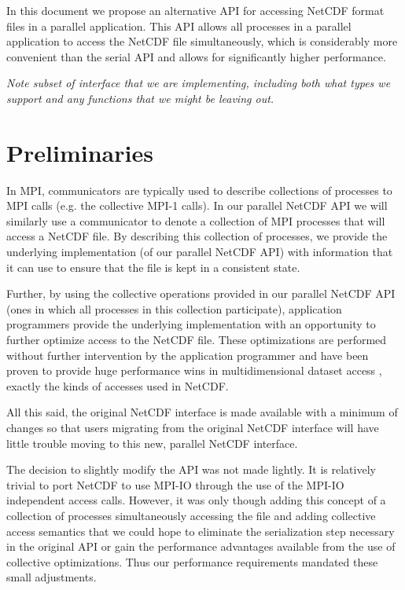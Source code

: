 \documentclass[10pt]{article}
\begin{document}
In this document we propose an alternative API for accessing NetCDF format
files in a parallel application.  This API allows all processes in a parallel
application to access the NetCDF file simultaneously, which is considerably
more convenient than the serial API and allows for significantly higher
performance.

\emph{Note subset of interface that we are implementing, including both what
types we support and any functions that we might be leaving out.}

\section{Preliminaries}

In MPI, communicators are typically used to describe collections of processes
to MPI calls (e.g. the collective MPI-1 calls).  In our parallel NetCDF API we
will similarly use a communicator to denote a collection of MPI processes that
will access a NetCDF file.  By describing this collection of processes, we
provide the underlying implementation (of our parallel NetCDF API) with
information that it can use to ensure that the file is kept in a consistent
state.  

Further, by using the collective operations provided in our parallel NetCDF
API (ones in which all processes in this collection participate), application
programmers provide the underlying implementation with an opportunity to
further optimize access to the NetCDF file.  These optimizations are performed
without further intervention by the application programmer and have been
proven to provide huge performance wins in multidimensional dataset access \cite{thakur:romio},
exactly the kinds of accesses used in NetCDF.

All this said, the original NetCDF interface is made available with a minimum
of changes so that users migrating from the original NetCDF interface will
have little trouble moving to this new, parallel NetCDF interface.

The decision to slightly modify the API was not made lightly.  It is
relatively trivial to port NetCDF to use MPI-IO through the use of the MPI-IO
independent access calls.  However, it was only though adding this concept of
a collection of processes simultaneously accessing the file and adding
collective access semantics that we could hope to eliminate the serialization
step necessary in the original API or gain the performance advantages
available from the use of collective optimizations.  Thus our performance
requirements mandated these small adjustments.
\end{document}

